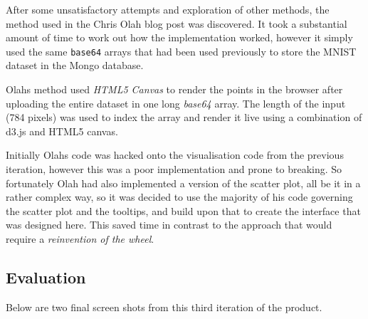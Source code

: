\documentclass[a4paper,11pt,titlepage]{article}
\begin{document}
	\par 
	After some unsatisfactory attempts and exploration of other methods, the method used in the Chris Olah blog post \cite{Olah2014d} was discovered. It took a substantial amount of time to work out how the implementation worked, however it simply used the same \texttt{base64} arrays that had been used previously to store the MNIST dataset in the Mongo database. 
	\par 
	Olahs method used \textit{HTML5 Canvas} to render the points in the browser after uploading the entire dataset in one long \textit{base64} array. The length of the input (784 pixels) was used to index the array and render it live using a combination of d3.js and HTML5 canvas.
	\par 
	Initially Olahs code was hacked onto the visualisation code from the previous iteration, however this was a poor implementation and prone to breaking. So fortunately Olah had also implemented a version of the scatter plot, all be it in a rather complex way, so it was decided to use the majority of his code governing the scatter plot and the tooltips, and build upon that to create the interface that was designed here. This saved time in contrast to the approach that would require a \textit{reinvention of the wheel}.	

	\subsection{Evaluation}
	Below are two final screen shots from this third iteration of the product. 
	
	
	\begin{figure}[H]
    			\centering	
    			\qquad

    			\caption{}%
    			\label{fig:pca_varimax}
	\end{figure}
	
\end{document}
